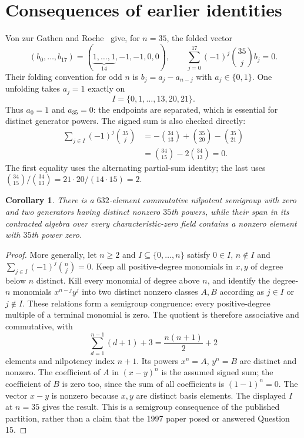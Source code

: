 \documentclass[11pt]{article}
\newtheorem{corollary}[theorem]{Corollary}
\begin{document}
\section{Consequences of earlier identities}\label{sec:older}
Von zur Gathen and Roche~\cite[Definition 3.2, equation (3.2), p.\ 350;
Theorem 4.4(i), p.\ 357; Table 2, p.\ 359]{GathenRoche} give, for $n=35$,
the folded vector
\[
(b_0,\ldots,b_{17})=(\underbrace{1,\ldots,1}_{14},-1,-1,0,0),
\qquad \sum_{j=0}^{17}(-1)^j\binom{35}{j}b_j=0.
\]
Their folding convention for odd $n$ is $b_j=a_j-a_{n-j}$ with
$a_j\in\{0,1\}$. One unfolding takes $a_j=1$ exactly on
\[
I=\{0,1,\ldots,13,20,21\}.
\]
Thus $a_0=1$ and $a_{35}=0$: the endpoints are separated, which is
essential for distinct generator powers. The signed sum is also checked directly:
\begin{align*}
\sum_{j\in I}(-1)^j\binom{35}{j}
&=-\binom{34}{13}+\binom{35}{20}-\binom{35}{21}\\
&=\binom{34}{15}-2\binom{34}{13}=0.
\end{align*}
The first equality uses the alternating partial-sum identity; the last
uses $\binom{34}{15}/\binom{34}{13}=21\cdot20/(14\cdot15)=2$.

\begin{corollary}\label{cor:rational}
There is a $632$-element commutative nilpotent semigroup with zero
and two generators having distinct nonzero $35$th powers, while their
span in its contracted algebra over every characteristic-zero field
contains a nonzero element with $35$th power zero.
\end{corollary}
\begin{proof}
More generally, let $n\ge2$ and $I\subseteq\{0,\ldots,n\}$ satisfy
$0\in I$, $n\notin I$ and $\sum_{j\in I}(-1)^j\binom nj=0$.
Keep all positive-degree monomials in $x,y$ of degree below $n$
distinct. Kill every monomial of degree above $n$, and identify the
degree-$n$ monomials $x^{n-j}y^j$ into two distinct nonzero classes
$A,B$ according as $j\in I$ or $j\notin I$.
These relations form a semigroup congruence: every positive-degree
multiple of a terminal monomial is zero. The quotient is therefore
associative and commutative, with
\[
\sum_{d=1}^{n-1}(d+1)+3=\frac{n(n+1)}2+2
\]
elements and nilpotency index $n+1$. Its powers $x^n=A$, $y^n=B$
are distinct and nonzero. The coefficient of $A$ in $(x-y)^n$ is
the assumed signed sum; the coefficient of $B$ is zero too, since the
sum of all coefficients is $(1-1)^n=0$. The vector $x-y$ is nonzero
because $x,y$ are distinct basis elements. The displayed $I$ at $n=35$
gives the result. This is a semigroup consequence of the published
partition, rather than a claim that the 1997 paper posed or answered
Question 15.
\end{proof}
\end{document}
